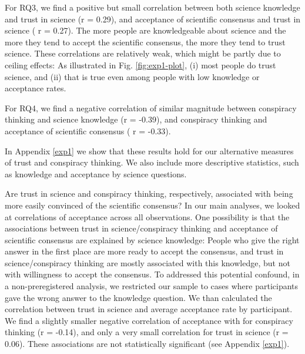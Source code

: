\documentclass[
  doc,floatsintext]{apa6}
\begin{document}
For RQ3, we find a positive but small correlation between both science knowledge and trust in science (r = 0.29), and acceptance of scientific consensus and trust in science ( r = 0.27). The more people are knowledgeable about science and the more they tend to accept the scientific consensus, the more they tend to trust science. These correlations are relatively weak, which might be partly due to ceiling effects: As illustrated in Fig. \ref{fig:exp1-plot}, (i) most people do trust science, and (ii) that is true even among people with low knowledge or acceptance rates.

For RQ4, we find a negative correlation of similar magnitude between conspiracy thinking and science knowledge (r = -0.39), and conspiracy thinking and acceptance of scientific consensus ( r = -0.33).

In Appendix \ref{exp1} we show that these results hold for our alternative measures of trust and conspiracy thinking. We also include more descriptive statistics, such as knowledge and acceptance by science questions.

Are trust in science and conspiracy thinking, respectively, associated with being more easily convinced of the scientific consensus? In our main analyses, we looked at correlations of acceptance across all observations. One possibility is that the associations between trust in science/conspiracy thinking and acceptance of scientific consensus are explained by science knowledge: People who give the right answer in the first place are more ready to accept the consensus, and trust in science/conspiracy thinking are mostly associated with this knowledge, but not with willingness to accept the consensus. To addressed this potential confound, in a non-preregistered analysis, we restricted our sample to cases where participants gave the wrong answer to the knowledge question. We than calculated the correlation between trust in science and average acceptance rate by participant. We find a slightly smaller negative correlation of acceptance with for conspiracy thinking (r = -0.14), and only a very small correlation for trust in science (r = 0.06). These associations are not statistically significant (see Appendix \ref{exp1}).
\end{document}

